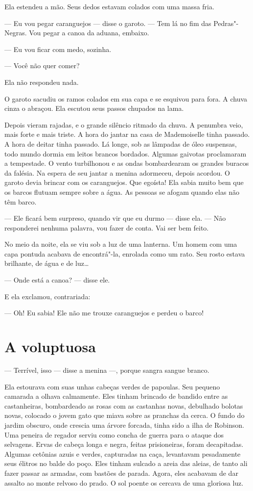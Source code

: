 Ela estendeu a mão. Seus dedos estavam colados com uma massa fria.

--- Eu vou pegar caranguejos --- disse o garoto. --- Tem lá no fim das
Pedras"-Negras. Vou pegar a canoa da aduana, embaixo.

--- Eu vou ficar com medo, sozinha.

--- Você não quer comer?

Ela não respondeu nada.

O garoto sacudiu os ramos colados em sua capa e se esquivou para fora.
A chuva cinza o abraçou. Ela escutou seus passos chupados na lama.

Depois vieram rajadas, e o grande silêncio ritmado da chuva. A penumbra
veio, mais forte e mais triste. A hora do jantar na casa de Mademoiselle
tinha passado. A hora de deitar tinha passado. Lá longe, sob as lâmpadas
de óleo suspensas, todo mundo dormia em leitos brancos bordados. Algumas
gaivotas proclamaram a tempestade. O vento turbilhonou e as ondas
bombardearam os grandes buracos da falésia. Na espera de seu jantar a
menina adormeceu, depois acordou. O garoto devia brincar com os
caranguejos. Que egoísta! Ela sabia muito bem que os barcos flutuam
sempre sobre a água. As pessoas se afogam quando elas não têm barco.

--- Ele ficará bem surpreso, quando vir que eu durmo --- disse ela. --- Não
responderei nenhuma palavra, vou fazer de conta. Vai ser bem feito.

No meio da noite, ela se viu sob a luz de uma lanterna. Um homem com
uma capa pontuda acabava de encontrá"-la, enrolada como um rato. Seu rosto
estava brilhante, de água e de luz\ldots{}

--- Onde está a canoa? --- disse ele.

E ela exclamou, contrariada:

--- Oh! Eu sabia! Ele não me trouxe caranguejos e perdeu o barco!

\section*{A voluptuosa}

--- Terrível, isso --- disse a menina ---, porque sangra sangue branco.

Ela estourava com suas unhas cabeças verdes de papoulas. Seu pequeno
camarada a olhava calmamente. Eles tinham brincado de bandido entre as
castanheiras, bombardeado as rosas com as castanhas novas, debulhado
bolotas novas, colocado o jovem gato que miava sobre as pranchas da cerca.
O fundo do jardim obscuro, onde crescia uma árvore forcada, tinha sido a
ilha de Robinson. Uma peneira de regador serviu como concha de guerra para
o ataque dos selvagens. Ervas de cabeça longa e negra, feitas
prisioneiras, foram decapitadas. Algumas cetônias azuis e verdes,
capturadas na caça, levantavam pesadamente seus élitros no balde do poço.
Eles tinham sulcado a areia das aleias, de tanto ali fazer passar as
armadas, com bastões de parada. Agora, eles acabavam de dar assalto ao
monte relvoso do prado. O sol poente os cercava de uma gloriosa luz.

